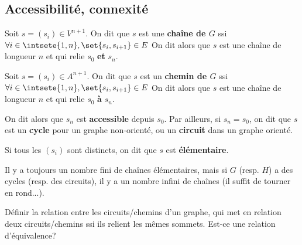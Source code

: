 \documentclass{scrartcl}
\begin{document}
		\subsection{Accessibilité, connexité}
			
			 Soit $s = (s_i)\in V^{n+1}$. 
			On dit que $s$ est une \textbf{chaîne de $G$} ssi
			$\forall i \in \intsete{1,n}, \set{s_i, s_{i+1}} \in E$
			On dit alors que $s$ est une chaîne de longueur $n$ et qui relie $s_0$ \textbf{et} $s_n$.

			 Soit $s = (s_i)\in A^{n+1}$. 
			On dit que $s$ est un \textbf{chemin de $G$} ssi
			$\forall i \in \intsete{1,n}, \set{s_i, s_{i+1}} \in E$	
			On dit alors que $s$ est une chaîne de longueur $n$ et qui relie $s_0$ \textbf{à} $s_n$.

			On dit alors que $s_n$ est \textbf{accessible} depuis $s_0$.
			Par ailleurs, si $s_n = s_0$, on dit que $s$ est un \textbf{cycle} pour un graphe non-orienté, 
			ou un \textbf{circuit} dans un graphe orienté.

			Si tous les $(s_i)$ sont distincts, on dit que $s$ est \textbf{élémentaire}. 

			\rem Il y a toujours un nombre fini de chaînes élémentaires, mais si $G$ (resp. $H$) a des cycles (resp. des circuits),
			il y a un nombre infini de chaînes (il suffit de tourner en rond...).

			\exo Définir la relation entre les circuits/chemins d'un graphe, 
			qui met en relation deux circuits/chemins ssi ils relient les mêmes sommets.
			Est-ce une relation d'équivalence?
\end{document}
